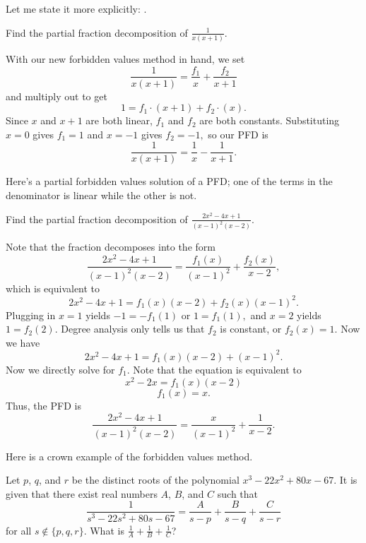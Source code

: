 \documentclass{article}
\begin{document}
Let me state it more explicitly: .

\begin{exam}
Find the partial fraction decomposition of $\frac{1}{x(x+1)}.$
\end{exam}

\begin{sol}
With our new forbidden values method in hand, we set
\[\frac{1}{x(x+1)}=\frac{f_1}{x}+\frac{f_2}{x+1}\]
and multiply out to get
\[1=f_1\cdot (x+1)+f_2\cdot (x).\]
Since $x$ and $x+1$ are both linear, $f_1$ and $f_2$ are both constants. Substituting $x=0$ gives $f_1=1$ and $x=-1$ gives $f_2=-1,$ so our PFD is
\[\frac{1}{x(x+1)}=\frac{1}{x}-\frac{1}{x+1}.\]
\end{sol}

Here's a partial forbidden values solution of a PFD; one of the terms in the denominator is linear while the other is not.

\begin{exam}
Find the partial fraction decomposition of $\frac{2x^2-4x+1}{(x-1)^2(x-2)}.$
\end{exam}

\begin{sol}
Note that the fraction decomposes into the form
\[\frac{2x^2-4x+1}{(x-1)^2(x-2)}=\frac{f_1(x)}{(x-1)^2}+\frac{f_2(x)}{x-2},\]
which is equivalent to
\[2x^2-4x+1=f_1(x)(x-2)+f_2(x)(x-1)^2.\]
Plugging in $x=1$ yields $-1=-f_1(1)$ or $1=f_1(1),$ and $x=2$ yields $1=f_2(2).$ Degree analysis only tells us that $f_2$ is constant, or $f_2(x)=1.$ Now we have
\[2x^2-4x+1=f_1(x)(x-2)+(x-1)^2.\]
Now we directly solve for $f_1.$ Note that the equation is equivalent to
\[x^2-2x=f_1(x)(x-2)\]
\[f_1(x)=x.\]
Thus, the PFD is
\[\frac{2x^2-4x+1}{(x-1)^2(x-2)}=\frac{x}{(x-1)^2}+\frac{1}{x-2}.\]
\end{sol}

Here is a crown example of the forbidden values method.

\begin{exam}[AMC 10A 2019/24]
Let $p$, $q$, and $r$ be the distinct roots of the polynomial $x^3 - 22x^2 + 80x - 67$. It is given that there exist real numbers $A$, $B$, and $C$ such that\[\dfrac{1}{s^3 - 22s^2 + 80s - 67} = \dfrac{A}{s-p} + \dfrac{B}{s-q} + \frac{C}{s-r}\]for all $s\not\in\{p,q,r\}$. What is $\tfrac1A+\tfrac1B+\tfrac1C$?
\end{exam}
\end{document}
